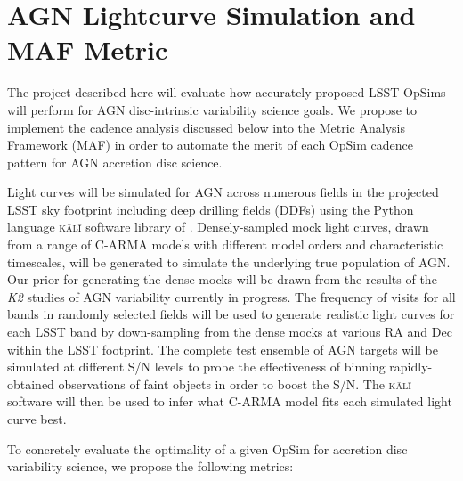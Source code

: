 \documentclass[times,preprint]{aastex}
\begin{document}
\section{AGN Lightcurve Simulation and MAF Metric}

The project described here will evaluate how accurately proposed LSST OpSims will perform for AGN disc-intrinsic variability science goals. We propose to implement the cadence analysis discussed below into the Metric Analysis Framework (MAF) in order to automate the merit of each OpSim cadence pattern for AGN accretion disc science.

Light curves will be simulated for AGN across numerous fields in the projected LSST sky footprint including deep drilling fields (DDFs) using the Python language \textsc{k\={a}l\={i}} software library of \citet{KasliwalCARMA}. Densely-sampled mock light curves, drawn from a range of C-ARMA models with different model orders and characteristic timescales, will be generated to simulate the underlying true population of AGN. Our prior for generating the dense mocks will be drawn from the results of the \textit{K2} studies of AGN variability currently in progress. The frequency of visits for all bands in randomly selected fields will be used to generate realistic light curves for each LSST band by down-sampling from the dense mocks at various RA and Dec within the LSST footprint.  The complete test ensemble of AGN targets will be simulated at different S/N levels to probe the effectiveness of binning rapidly-obtained observations of faint objects in order to boost the S/N. The \textsc{k\={a}l\={i}} software will then be used to infer what C-ARMA model fits each simulated light curve best.

To concretely evaluate the optimality of a given OpSim for accretion disc variability science, we propose the following metrics: 
\end{document}
